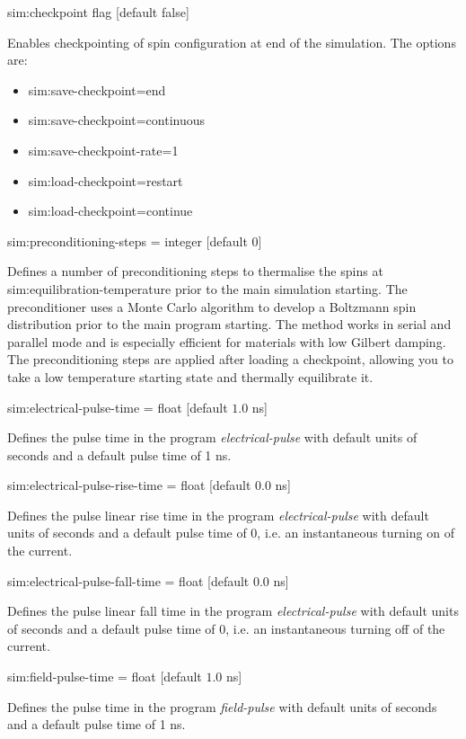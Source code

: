 {\zicf sim:checkpoint flag [default false]} Enables checkpointing of spin configuration at end of the simulation. The options are:

\begin{itemize}
  \item[] sim:save-checkpoint=end
  \item[] sim:save-checkpoint=continuous
  \item[] sim:save-checkpoint-rate=1
  \item[] sim:load-checkpoint=restart
  \item[] sim:load-checkpoint=continue
\end{itemize}

{\zicf sim:preconditioning-steps = integer [default 0]} Defines a number of preconditioning steps to thermalise the spins at sim:equilibration-temperature prior to the main simulation starting. The preconditioner uses a Monte Carlo algorithm to develop a Boltzmann spin distribution prior to the main program starting. The method works in serial and parallel mode and is especially efficient for materials with low Gilbert damping. The preconditioning steps are applied after loading a checkpoint, allowing you to take a low temperature starting state and thermally equilibrate it.

{\zicf sim:electrical-pulse-time = float [default $1.0$ ns]}
Defines the pulse time in the program \textit{electrical-pulse} with default
units of seconds and a default pulse time of 1 ns.

{\zicf sim:electrical-pulse-rise-time = float [default $0.0$ ns]}
Defines the pulse linear rise time in the program \textit{electrical-pulse} with
 default units of seconds and a default pulse time of 0, i.e. an instantaneous
 turning on of the current.

{\zicf sim:electrical-pulse-fall-time = float [default $0.0$ ns]}
Defines the pulse linear fall time in the program \textit{electrical-pulse} with
 default units of seconds and a default pulse time of 0, i.e. an instantaneous
 turning off of the current.

 {\zicf sim:field-pulse-time = float [default $1.0$ ns]}
 Defines the pulse time in the program \textit{field-pulse} with default
 units of seconds and a default pulse time of 1 ns.

